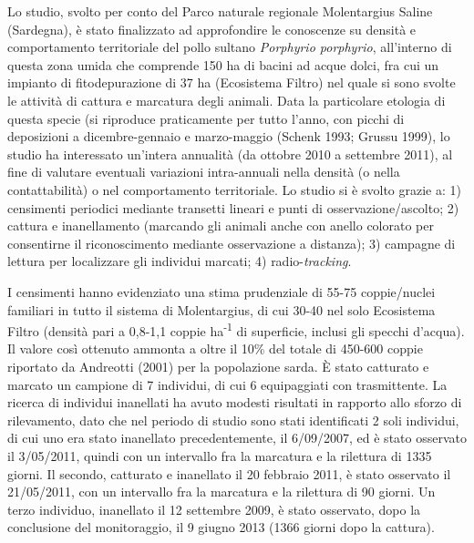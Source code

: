 {
Lo studio, svolto per conto del Parco naturale regionale Molentargius
Saline (Sardegna), \`e stato finalizzato ad approfondire le conoscenze
su densit\`a e comportamento territoriale del pollo sultano
\textit{Porphyrio porphyrio}, all{\textquoteright}interno di questa
zona umida che comprende 150 ha di bacini ad acque dolci, fra cui un
impianto di fitodepurazione di 37 ha (Ecosistema Filtro) nel quale si
sono svolte le attivit\`a di cattura e marcatura degli animali. Data la
particolare etologia di questa specie (si riproduce praticamente per
tutto l{\textquoteright}anno, con picchi di deposizioni a
dicembre-gennaio e marzo-maggio
(\textcolor[rgb]{0.0,0.0,0.039215688}{Schenk 1993; Grussu 1999)}, lo
studio ha interessato un{\textquoteright}intera annualit\`a (da ottobre
2010 a settembre 2011), al fine di valutare eventuali variazioni
intra-annuali nella densit\`a (o nella contattabilit\`a) o nel
comportamento territoriale. Lo studio si \`e svolto grazie a: 1)
censimenti periodici mediante transetti lineari e punti di
osservazione/ascolto; 2) cattura e inanellamento (marcando gli animali
anche con anello colorato per consentirne il riconoscimento mediante
osservazione a distanza); 3) campagne di lettura per localizzare gli
individui marcati; 4) radio-\textit{tracking}.}

{
I censimenti hanno evidenziato una stima prudenziale di 55-75
coppie/nuclei familiari in tutto il sistema di Molentargius, di cui
30-40 nel solo Ecosistema Filtro (densit\`a pari a 0,8-1,1 coppie
ha\textsuperscript{{}-1} di superficie, inclusi gli specchi
d{\textquoteright}acqua). Il valore cos\`i ottenuto ammonta a oltre il
10\% del totale di 450-600 coppie riportato da Andreotti (2001) per la
popolazione sarda. \`E stato catturato e marcato un campione di 7
individui, di cui 6 equipaggiati con trasmittente. La ricerca di
individui inanellati ha avuto modesti risultati in rapporto allo sforzo
di rilevamento, dato che nel periodo di studio sono stati identificati
2 soli individui, di cui uno era stato inanellato precedentemente, il
6/09/2007, ed \`e stato osservato il 3/05/2011, quindi con un
intervallo fra la marcatura e la rilettura di 1335 giorni. Il secondo,
catturato e inanellato il 20 febbraio 2011, \`e stato osservato il
21/05/2011, con un intervallo fra la marcatura e la rilettura di 90
giorni. Un terzo individuo, inanellato il 12 settembre 2009, \`e stato
osservato, dopo la conclusione del monitoraggio, il 9 giugno 2013 (1366
giorni dopo la cattura).}

